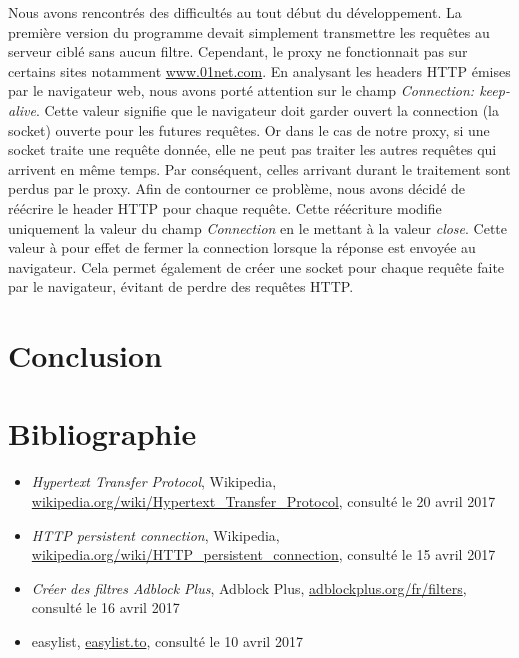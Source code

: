 \documentclass[a4paper,11pt, oneside]{book}
\begin{document}
			\noindent Nous avons rencontrés des difficultés au tout début du développement.
			La première version du programme devait simplement transmettre les requêtes au serveur ciblé sans aucun filtre.
			Cependant, le proxy ne fonctionnait pas sur certains sites notamment \href{http://www.01net.com}{www.01net.com}.
			En analysant les headers HTTP émises par le navigateur web, nous avons porté attention sur le champ
			\textit{Connection: keep-alive}. Cette valeur signifie que le navigateur doit garder ouvert la connection (la socket) ouverte
			pour les futures requêtes. Or dans le cas de notre proxy, si une socket traite une requête donnée, elle ne peut
			pas traiter les autres requêtes qui arrivent en même temps. Par conséquent, celles arrivant durant le traitement sont perdus par
			le proxy. Afin de contourner ce problème,
			nous avons décidé de réécrire le header HTTP pour chaque requête. Cette réécriture
			modifie uniquement la valeur du champ \textit{Connection} en le mettant à la valeur \textit{close}.
			Cette valeur à pour effet de fermer la connection lorsque la réponse est envoyée au navigateur. Cela permet
			également de créer une socket pour chaque requête faite par le navigateur, évitant de perdre des requêtes HTTP.


			\chapter{Conclusion}


			\chapter{Bibliographie}
			\begin{itemize}
				\item \textit{Hypertext Transfer Protocol}, Wikipedia, \\\href{https://en.wikipedia.org/wiki/Hypertext\_Transfer\_Protocol}
				{wikipedia.org/wiki/Hypertext\_Transfer\_Protocol}, consulté le 20 avril 2017

				\item \textit{HTTP persistent connection}, Wikipedia, \\\href{https://en.wikipedia.org/wiki/HTTP\_persistent\_connection}
				{wikipedia.org/wiki/HTTP\_persistent\_connection}, consulté le 15 avril 2017

				\item \textit{Créer des filtres Adblock Plus}, Adblock Plus, \href{https://adblockplus.org/fr/filters}{adblockplus.org/fr/filters}, consulté le 16 avril 2017
				\item easylist, \href{https://easylist.to/}{easylist.to}, consulté le 10 avril 2017
			\end{itemize}
\end{document}
